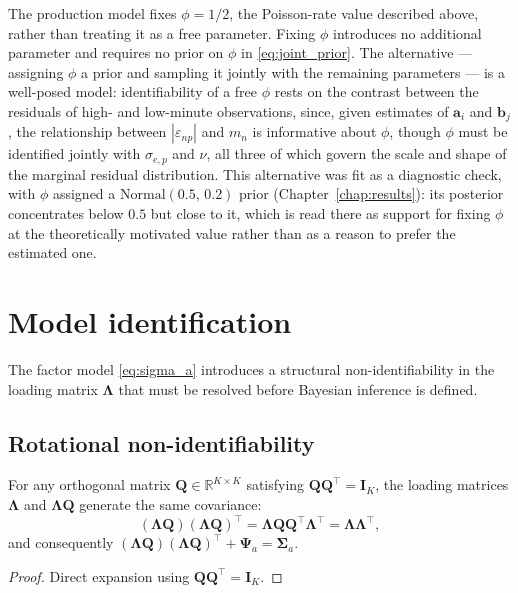 \begin{remark}
\label{rem:phi}
The production model fixes $\phi = 1/2$, the Poisson-rate value described above, rather than treating it as a free parameter. Fixing $\phi$ introduces no additional parameter and requires no prior on $\phi$ in \eqref{eq:joint_prior}. The alternative --- assigning $\phi$ a prior and sampling it jointly with the remaining parameters --- is a well-posed model: identifiability of a free $\phi$ rests on the contrast between the residuals of high- and low-minute observations, since, given estimates of $\mathbf{a}_i$ and $\mathbf{b}_j$, the relationship between $|\varepsilon_{np}|$ and $m_n$ is informative about $\phi$, though $\phi$ must be identified jointly with $\sigma_{e,p}$ and $\nu$, all three of which govern the scale and shape of the marginal residual distribution. This alternative was fit as a diagnostic check, with $\phi$ assigned a $\mathrm{Normal}(0.5,\, 0.2)$ prior (Chapter~\ref{chap:results}): its posterior concentrates below $0.5$ but close to it, which is read there as support for fixing $\phi$ at the theoretically motivated value rather than as a reason to prefer the estimated one.
\end{remark}

\section{Model identification}
\label{sec:identification}

The factor model \eqref{eq:sigma_a} introduces a structural non-identifiability in the loading matrix $\boldsymbol{\Lambda}$ that must be resolved before Bayesian inference is defined.

\subsection{Rotational non-identifiability}

\begin{proposition}
\label{prop:rotation}
For any orthogonal matrix $\mathbf{Q} \in \mathbb{R}^{K \times K}$ satisfying $\mathbf{Q}\mathbf{Q}^\top = \mathbf{I}_K$, the loading matrices $\boldsymbol{\Lambda}$ and $\boldsymbol{\Lambda}\mathbf{Q}$ generate the same covariance:
\begin{equation}
(\boldsymbol{\Lambda}\mathbf{Q})(\boldsymbol{\Lambda}\mathbf{Q})^\top = \boldsymbol{\Lambda}\mathbf{Q}\mathbf{Q}^\top\boldsymbol{\Lambda}^\top = \boldsymbol{\Lambda}\boldsymbol{\Lambda}^\top,
\label{eq:rotation_equiv}
\end{equation}
and consequently $(\boldsymbol{\Lambda}\mathbf{Q})(\boldsymbol{\Lambda}\mathbf{Q})^\top + \boldsymbol{\Psi}_a = \boldsymbol{\Sigma}_a$.
\end{proposition}
\begin{proof}
Direct expansion using $\mathbf{Q}\mathbf{Q}^\top = \mathbf{I}_K$.
\end{proof}

